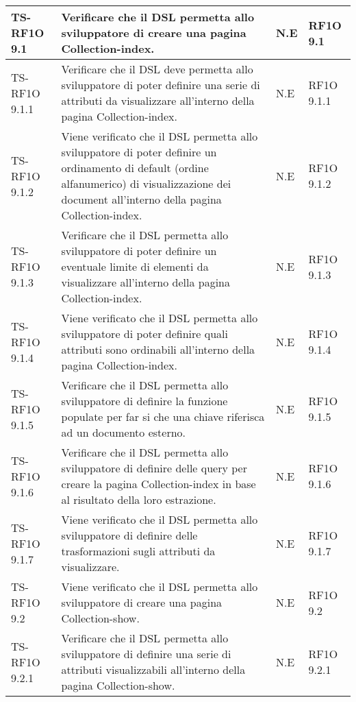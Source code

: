 \begin{center}
\begin{longtable}{| p{3cm} | p{6cm} | p{1.5cm} | p{2cm} | }
				TS-RF1O 9.1 & 
				Verificare che il DSL permetta allo sviluppatore di creare una pagina Collection-index. & N.E & RF1O 9.1 \newline  \\ \hline 
				TS-RF1O 9.1.1 & 
				Verificare che il DSL deve permetta allo sviluppatore di poter definire una serie di attributi da visualizzare all’interno della pagina Collection-index. & N.E & RF1O 9.1.1 \newline  \\ \hline 
				TS-RF1O 9.1.2 & 
				Viene verificato che il DSL permetta allo sviluppatore di poter definire un ordinamento di default (ordine alfanumerico) di visualizzazione dei document all'interno della pagina Collection-index. & N.E & RF1O 9.1.2 \newline  \\ \hline 
				TS-RF1O 9.1.3 & 
				Verificare che il DSL permetta allo sviluppatore di poter definire un eventuale limite di elementi da visualizzare all’interno della pagina Collection-index. & N.E & RF1O 9.1.3 \newline  \\ \hline 
				TS-RF1O 9.1.4 & 
				Viene verificato che il DSL permetta allo sviluppatore di poter definire quali attributi sono ordinabili all’interno della pagina Collection-index. & N.E & RF1O 9.1.4 \newline  \\ \hline 
				TS-RF1O 9.1.5 & 
				Verificare che il DSL permetta allo sviluppatore di definire la funzione populate per far si che una chiave riferisca ad un documento esterno. & N.E & RF1O 9.1.5 \newline  \\ \hline 
				TS-RF1O 9.1.6 & 
				Verificare che il DSL permetta allo sviluppatore di definire delle query per creare la pagina Collection-index in base al risultato della loro estrazione. & N.E & RF1O 9.1.6 \newline  \\ \hline 
				TS-RF1O 9.1.7 & 
				Viene verificato che il DSL permetta allo sviluppatore di definire delle trasformazioni sugli attributi da visualizzare. & N.E & RF1O 9.1.7 \newline  \\ \hline 
				TS-RF1O 9.2 & 
				Viene verificato che il DSL permetta allo sviluppatore di creare una pagina Collection-show. & N.E & RF1O 9.2 \newline  \\ \hline 
				TS-RF1O 9.2.1 & 
				Verificare che il DSL permetta allo sviluppatore di definire una serie di attributi visualizzabili all’interno della pagina Collection-show. & N.E & RF1O 9.2.1 \newline  \\ \hline 

\end{longtable}
\end{center}
